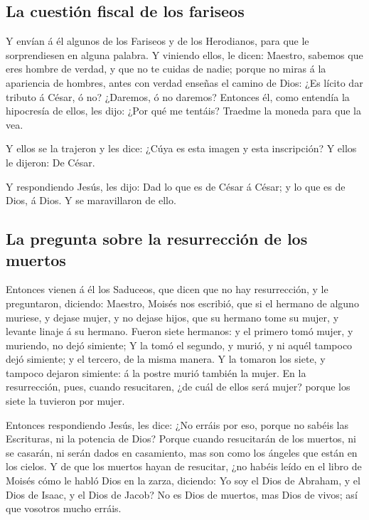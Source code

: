 \hypertarget{la-cuestiuxf3n-fiscal-de-los-fariseos}{%
\subsection{La cuestión fiscal de los
fariseos}\label{la-cuestiuxf3n-fiscal-de-los-fariseos}}

 Y envían á él algunos de los Fariseos y de los
Herodianos, para que le sorprendiesen en alguna palabra. 
Y viniendo ellos, le dicen: Maestro, sabemos que eres hombre de verdad,
y que no te cuidas de nadie; porque no miras á la apariencia de hombres,
antes con verdad enseñas el camino de Dios: ¿Es lícito dar tributo á
César, ó no? ¿Daremos, ó no daremos?  Entonces él, como
entendía la hipocresía de ellos, les dijo: ¿Por qué me tentáis? Traedme
la moneda para que la vea.

 Y ellos se la trajeron y les dice: ¿Cúya es esta imagen
y esta inscripción? Y ellos le dijeron: De César.

 Y respondiendo Jesús, les dijo: Dad lo que es de César á
César; y lo que es de Dios, á Dios. Y se maravillaron de ello.

\hypertarget{la-pregunta-sobre-la-resurrecciuxf3n-de-los-muertos}{%
\subsection{La pregunta sobre la resurrección de los
muertos}\label{la-pregunta-sobre-la-resurrecciuxf3n-de-los-muertos}}

 Entonces vienen á él los Saduceos, que dicen que no hay
resurrección, y le preguntaron, diciendo:  Maestro,
Moisés nos escribió, que si el hermano de alguno muriese, y dejase
mujer, y no dejase hijos, que su hermano tome su mujer, y levante linaje
á su hermano.  Fueron siete hermanos: y el primero tomó
mujer, y muriendo, no dejó simiente;  Y la tomó el
segundo, y murió, y ni aquél tampoco dejó simiente; y el tercero, de la
misma manera.  Y la tomaron los siete, y tampoco dejaron
simiente: á la postre murió también la mujer.  En la
resurrección, pues, cuando resucitaren, ¿de cuál de ellos será mujer?
porque los siete la tuvieron por mujer.

 Entonces respondiendo Jesús, les dice: ¿No erráis por
eso, porque no sabéis las Escrituras, ni la potencia de Dios?
 Porque cuando resucitarán de los muertos, ni se casarán,
ni serán dados en casamiento, mas son como los ángeles que están en los
cielos.  Y de que los muertos hayan de resucitar, ¿no
habéis leído en el libro de Moisés cómo le habló Dios en la zarza,
diciendo: Yo soy el Dios de Abraham, y el Dios de Isaac, y el Dios de
Jacob?  No es Dios de muertos, mas Dios de vivos; así que
vosotros mucho erráis.


